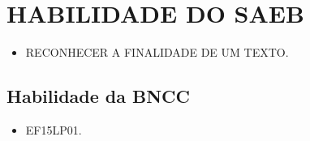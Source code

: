 \section*{HABILIDADE DO SAEB}

\begin{itemize}
\item \uppercase{Reconhecer a finalidade de um texto.}
\end{itemize}

\subsection{Habilidade da BNCC}

\begin{itemize}
\item EF15LP01.
\end{itemize}

